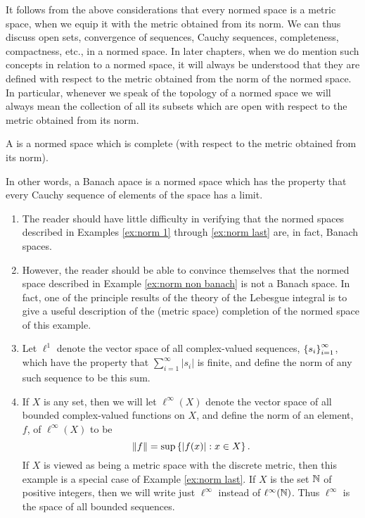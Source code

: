 It follows from the above considerations that every normed space is a metric space, when we equip it with the metric obtained from its norm. We can thus discuss open sets, convergence of sequences, Cauchy sequences, completeness, compactness, etc., in a normed space. In later chapters, when we do mention such concepts in relation to a normed space, it will always be understood that they are defined with respect to the metric obtained from the norm of the normed space. In particular, whenever we speak of the topology of a normed space we will always mean the collection of all its subsets which are open with respect to the metric obtained from its norm.

\begin{definition}
A  is a normed space which is complete (with respect to the metric obtained from its norm).
\end{definition}

In other words, a Banach apace is a normed space which has the property that every Cauchy sequence of elements of the space has a limit.


\begin{examples}
\begin{enumerate}
    \item\label{ex:banach 1}
    The reader should have little difficulty in verifying that the normed spaces described in Examples \ref{ex:norm 1} through \ref{ex:norm last} are, in fact, Banach spaces.
    
    \item\label{ex:banach non ex}
    However, the reader should be able to convince themselves that the normed space described in Example \ref{ex:norm non banach} is not a Banach space. In fact, one of the principle results of the theory of the Lebesgue integral is to give a useful description of the (metric space) completion of the normed space of this example.
    
    \item\label{ex:banach 2}
    Let $\ell^1$ denote the vector space of all complex-valued sequences, $\left\{s_i\right\}_{i=1}^\infty$, which have the property that $\sum_{i=1}^\infty|s_i|$ is finite, and define the norm of any such sequence to be this sum.
    
    \item\label{ex:banach 3}
    If $X$ is any set, then we will let $\ell^\infty(X)$ denote the vector space of all bounded complex-valued functions on $X$, and define the norm of an element, $f$, of $\ell^\infty(X)$ to be $$\norm{f}=\sup\left\{|f(x)|:x\in X\right\}.$$ If $X$ is viewed as being a metric space with the discrete metric, then this example is a special case of Example \ref{ex:norm last}. If $X$ is the set $\mathbb{N}$ of positive integers, then we will write just $\ell^\infty$ instead of $\ell^\infty(\mathbb{N})$. Thus $\ell^\infty$ is the space of all bounded sequences.
\end{enumerate} 
\end{examples}

